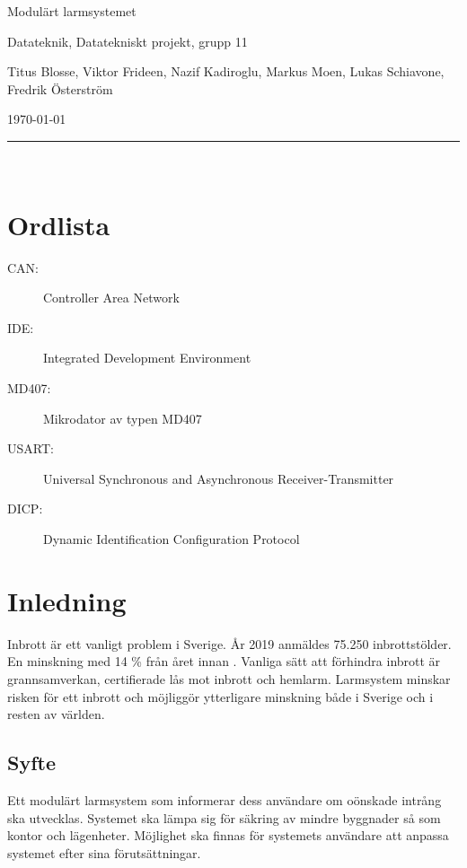 \documentclass[a4paper]{article}
\begin{document}
\thispagestyle{empty}

\begin{center}
    \parskip=14pt
    \vspace*{3\parskip}

    {\LARGE Modulärt larmsystemet}

    {\large Datateknik, Datatekniskt projekt, grupp 11

    Titus Blosse, Viktor Frideen, Nazif Kadiroglu, Markus Moen, Lukas Schiavone, Fredrik Österström

    \today}

    \rule{7cm}{0.4pt}\\
\end{center}
\newpage

\thispagestyle{empty}

\tableofcontents
\newpage

\thispagestyle{empty}

\section*{Ordlista}

\begin{description}
    \item[CAN:] Controller Area Network
    \item[IDE:] Integrated Development Environment
    \item[MD407:] Mikrodator av typen MD407
    \item[USART:] Universal Synchronous and Asynchronous Receiver-Transmitter
    \item[DICP:] Dynamic Identification Configuration Protocol
\end{description}
\newpage


\section{Inledning}
Inbrott är ett vanligt problem i Sverige.
År 2019 anmäldes 75.250 inbrottstölder.
En minskning med 14 \% från året innan \cite{brastold}.
Vanliga sätt att förhindra inbrott är grannsamverkan, certifierade lås mot inbrott och hemlarm.
Larmsystem minskar risken för ett inbrott och möjliggör ytterligare minskning både i Sverige och i resten av världen.

\subsection{Syfte}
Ett modulärt larmsystem som informerar dess användare om oönskade intrång ska utvecklas.
Systemet ska lämpa sig för säkring av mindre byggnader så som kontor och lägenheter.
Möjlighet ska finnas för systemets användare att anpassa systemet efter sina förutsättningar.
\end{document}
